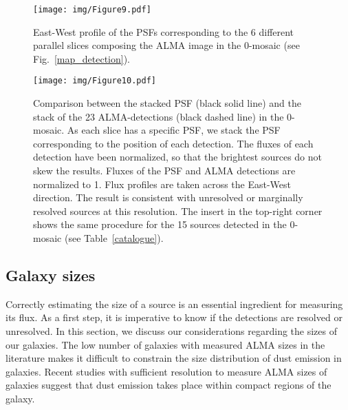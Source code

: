 \documentclass[longauth]{aa}
\begin{document}
\begin{figure}
   \centering
   \texttt{[image: img/Figure9.pdf]}
      \caption{East-West profile of the PSFs corresponding to the 6 different parallel slices composing the ALMA image in the 0-mosaic (see Fig.~\ref{map_detection}).}
         \label{profile_psf}
\end{figure}


\begin{figure}
   \centering
   \texttt{[image: img/Figure10.pdf]}
      \caption{Comparison between the stacked PSF (black solid line) and the stack of the 23 ALMA-detections (black dashed line) in the 0-mosaic. As each slice has a specific PSF, we stack the PSF corresponding to the position of each detection. The fluxes of each detection have been normalized, so that the brightest sources do not skew the results. Fluxes of the PSF and ALMA detections are normalized to 1. Flux profiles are taken across the East-West direction. The result is consistent with unresolved or marginally resolved sources at this resolution. The insert in the top-right corner shows the same procedure for the 15 sources detected in the 0-mosaic (see Table~\ref{catalogue}).}
         \label{compare_stack_psf_sources_23_peak}
\end{figure}

\subsection{Galaxy sizes}\label{sec:galaxy_sizes}

Correctly estimating the size of a source is an essential ingredient for measuring its flux. As a first step, it is imperative to know if the detections are resolved or unresolved. In this section, we discuss our considerations regarding the sizes of our galaxies. The low number of galaxies with measured ALMA sizes in the literature makes it difficult to constrain the size distribution of dust emission in galaxies. Recent studies \citep[e.g.][]{Barro2016, Rujopakarn2016, Elbaz2017, Ikarashi2017, Fujimoto2017} with sufficient resolution to measure ALMA sizes of galaxies suggest that dust emission takes place within compact regions of the galaxy.
\end{document}
